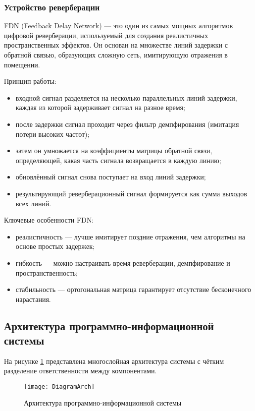 \subsubsection{Устройство реверберации}

FDN (Feedback Delay Network) — это один из самых мощных алгоритмов цифровой реверберации, используемый для создания реалистичных пространственных эффектов. Он основан на множестве линий задержки с обратной связью, образующих сложную сеть, имитирующую отражения в помещении.

Принцип работы:
\begin{itemize}
	\item входной сигнал разделяется на несколько параллельных линий задержки, каждая из которой задерживает сигнал на разное время;
	\item после задержки сигнал проходит через фильтр демпфирования (имитация потери высоких частот);
	\item затем он умножается на коэффициенты матрицы обратной связи, определяющей, какая часть сигнала возвращается в каждую линию;
	\item обновлённый сигнал снова поступает на вход линий задержки;
	\item результирующий реверберационный сигнал формируется как сумма выходов всех линий.
\end{itemize}

Ключевые особенности FDN:
\begin{itemize}
	\item реалистичность — лучше имитирует поздние отражения, чем алгоритмы на основе простых задержек;
	\item гибкость — можно настраивать время реверберации, демпфирование и пространственность;
	\item стабильность — ортогональная матрица гарантирует отсутствие бесконечного нарастания.
\end{itemize}

\subsection{Архитектура программно-информационной системы}

На рисунке \ref{DiagramArch:image} представлена многослойная архитектура системы с чётким разделение ответственности между компонентами.

\begin{figure}[p]  %
	\centering
	\texttt{[image: DiagramArch]}
	\caption{Архитектура программно-информационной системы}
	\label{DiagramArch:image}
\end{figure}
\clearpage

